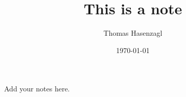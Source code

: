 \documentclass[11 pt,a4paper]{article}
\title{This is a note}
\author{Thomas Hasenzagl}
\date{\today}
\begin{document}
\maketitle
Add your notes here. 
\end{document}
